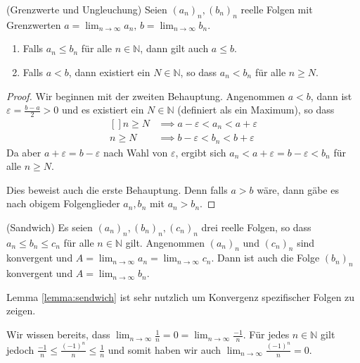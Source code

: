 \documentclass[../Analysis1_script.tex]{subfiles}
\begin{document}
\begin{proposition}{(Grenzwerte und Ungleuchung)}\label{prop:lims_and_ineqs}
	Seien $(a_n)_n, (b_n)_n$ reelle Folgen mit Grenzwerten $a = \lim_{n \to \infty}a_n, \, b = \lim_{n \to \infty}b_n$.
	\begin{enumerate}
		\item Falls $a_n \leq b_n$ für alle $n \in \mathbb{N}$, dann gilt auch $a \leq b$.
		\item Falls $a < b$, dann existiert ein $N \in \mathbb{N}$, so dass $a_n < b_n$ für alle $n \geq N$.
	\end{enumerate}
\end{proposition}

\begin{proof}
	Wir beginnen mit der zweiten Behauptung. Angenommen $a<b$, dann ist $\varepsilon = \frac {b-a}{2}>0$ und es existiert ein $N \in \mathbb {N}$ (definiert als ein Maximum), so dass
	\[\begin{aligned}[]
		n\geq N &\implies a-\varepsilon < a_n < a+\varepsilon \\ 
		n\geq N &\implies b-\varepsilon < b_n < b+\varepsilon
	\end{aligned}\]
	Da aber $a+\varepsilon = b-\varepsilon$ nach Wahl von $\varepsilon$, ergibt sich $a_n < a+\varepsilon = b-\varepsilon <b_n$ für alle $n\geq N$.

	Dies beweist auch die erste Behauptung. Denn falls $a>b$ wäre, dann gäbe es nach obigem Folgenglieder $a_n,b_n$ mit $a_n > b_n$. 
\end{proof}

\begin{lemma}{(Sandwich)}\label{lemma:sndwich}
	Es seien $(a_n)_n,(b_n)_n,(c_n)_n$ drei reelle Folgen, so dass $a_n \leq b_n \leq c_n$ für alle $n \in \mathbb {N}$ gilt. Angenommen $(a_n)_n$ und $(c_n)_n$ sind konvergent und $A = \lim _{n\to \infty }a_n = \lim _{n\to \infty }c_n$. Dann ist auch die Folge $(b_n)_n$ konvergent und $A = \lim _{n \to \infty }b_n$. 
\end{lemma}

Lemma \ref{lemma:sendwich} ist sehr nutzlich um Konvergenz spezifischer Folgen zu zeigen.

\begin{example}
	Wir wissen bereits, dass $\lim _{n \to \infty } \frac {1}{n} = 0 = \lim _{n \to \infty } \frac {-1}{n}$. Für jedes $n \in \mathbb {N}$ gilt jedoch $\frac {-1}{n} \leq \frac {(-1)^n}{n} \leq \frac {1}{n}$ und somit haben wir auch $\lim _{n \to \infty } \frac {(-1)^n}{n} = 0$. 
\end{example}
\end{document}
